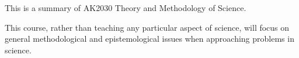 This is a summary of AK2030 Theory and Methodology of Science.

This course, rather than teaching any particular aspect of science, will focus on general methodological and epistemological issues when approaching problems in science.